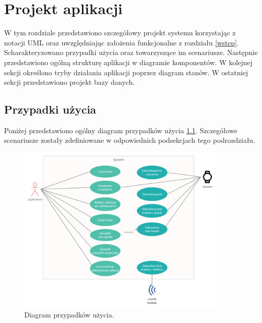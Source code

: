 \chapter{Projekt aplikacji}
\thispagestyle{chapterBeginStyle}
\label{rozdzial2}
W tym rozdziale przedstawiono szczegółowy projekt systemu korzystając z notacji UML oraz uwzględniając założenia funkcjonalne z rozdziału \ref{wstep}.
Scharakteryzowano przypadki użycia oraz towarzyszące im scenariusze. Następnie przedstawiono ogólną strukturę aplikacji w diagramie komponentów. W kolejnej sekcji określono tryby działania aplikacji poprzez diagram stanów. W ostatniej sekcji przedstawiono projekt bazy danych. 

\section{Przypadki użycia}
Poniżej przedstawiono ogólny diagram przypadków użycia \ref{use_case}. Szczegółowe scenariusze zostały zdefiniowane w odpowiednich podsekcjach tego podrozdziału.
\begin{figure}[H]
    \begin{center}
        \includegraphics[width=0.9\textwidth]{UseCaseDiagram.png}
    \end{center}
    \caption{{\color{dgray}Diagram przypadków użycia.}} \label{use_case}
\end{figure}

